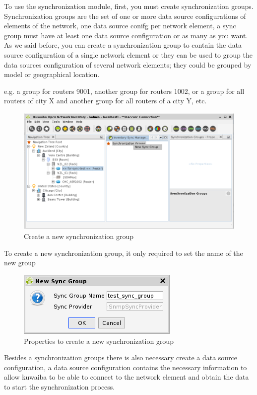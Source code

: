 \documentclass[a4paper]{article}
\begin{document}
			To use the synchronization module, first, you must create synchronization groups. Synchronization groups are the set of one or more data source configurations of elements of the network, one data source conifg per network element, a sync group must have at least one data source configuration or as many as you want.\\
			
			As we said before, you can create a synchronization group to contain the data source configuration of a single network element or they can be used to group the data sources configuration of several network elements; they could be grouped by model or geographical location.
			
			e.g. a group for routers 9001, another group for routers 1002, or a group for all routers of city X and another group for all routers of a city Y, etc.
			
			\begin{figure}[h!]
				\centering
				\includegraphics[width=0.8\linewidth]{img/sync_new_sync_group.png}
				\caption{Create a new synchronization group}
				\label{fig:sync_new_sync_group}
			\end{figure}

			To create a new synchronization group, it only required to set the name of the new group

			\begin{figure}[h!]
				\centering
				\includegraphics[width=0.4\linewidth]{img/sync_sync_group_properties.png}
				\caption{Properties to create a new synchronization group}
				\label{fig:sync_sync_group_properties}
			\end{figure}

			Besides a synchronization groups there is also necessary create a data source configuration, a data source configuration contains the necessary information to allow kuwaiba to be able to connect to the network element and obtain the data to start the synchronization process.\\
			
\end{document}
